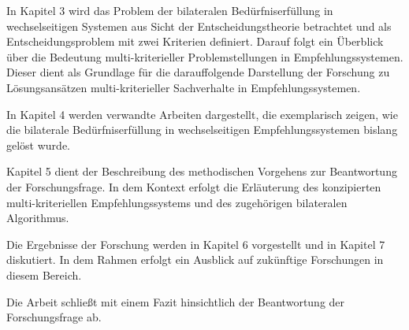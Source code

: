 In Kapitel 3 wird das Problem der bilateralen Bedürfniserfüllung in wechselseitigen Systemen aus Sicht der Entscheidungstheorie betrachtet und als Entscheidungsproblem mit zwei Kriterien definiert.
Darauf folgt ein Überblick über die Bedeutung multi-kriterieller Problemstellungen in Empfehlungssystemen.
Dieser dient als Grundlage für die darauffolgende Darstellung der Forschung zu Lösungsansätzen multi-kriterieller Sachverhalte in Empfehlungssystemen.

In Kapitel 4 werden verwandte Arbeiten dargestellt, die exemplarisch zeigen, wie die bilaterale Bedürfniserfüllung in wechselseitigen Empfehlungssystemen bislang gelöst wurde.

Kapitel 5 dient der Beschreibung des methodischen Vorgehens zur Beantwortung der Forschungsfrage.
In dem Kontext erfolgt die Erläuterung des konzipierten multi-kriteriellen Empfehlungssystems und des zugehörigen bilateralen Algorithmus.

Die Ergebnisse der Forschung werden in Kapitel 6 vorgestellt und in Kapitel 7 diskutiert.
In dem Rahmen erfolgt ein Ausblick auf zukünftige Forschungen in diesem Bereich.

Die Arbeit schließt mit einem Fazit hinsichtlich der Beantwortung der Forschungsfrage ab.




